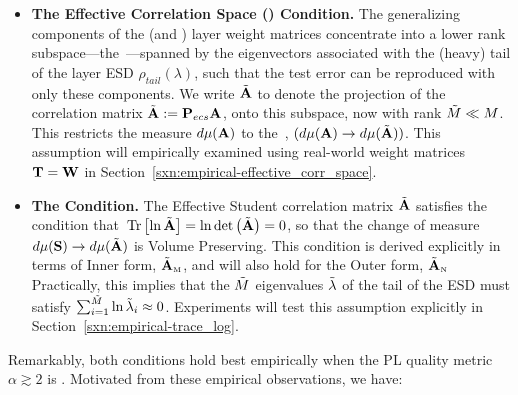 \begin{itemize}
  \item
  \textbf{The Effective Correlation Space (\ECS) Condition.}
  The generalizing components of the \Student (and \Teacher) layer weight matrices concentrate into a lower rank subspace---the~\ECS---spanned by the
  eigenvectors associated with the (heavy) tail of the layer ESD $\rho_{tail}(\lambda)$, such that the test error can 
  be reproduced with only these components. 
  We write $\tilde{\mathbf{A}}$ to denote the projection of the correlation
  matrix $\tilde{\mathbf{A}}:=\mathbf{P}_{ecs}\mathbf{A}$, onto this subspace, now with rank $\tilde{M}\ll M$.
  This restricts the measure $d\mu(\mathbf{A})$ to the~\ECS, $(d\mu(\mathbf{A})\rightarrow d\mu(\tilde{\mathbf{A}}))$.
  This assumption will empirically examined using real-world \Teacher weight matrices ${\mathbf{T}}={\mathbf{W}}$
  in Section~\ref{sxn:empirical-effective_corr_space}. 
  \item
  \textbf{The \TRACELOG Condition.}
  The Effective Student correlation matrix $\tilde{\mathbf{A}}$ 
  satisfies the condition that $\mbox{}\operatorname{Tr}\left[\ln\tilde{\mathbf{A}}\right]=\ln\mbox{}{\text{det}}\left(\tilde{\mathbf{A}}\right)=0$,
  so that the change of measure $d\mu({\mathbf{S}}) \rightarrow d\mu(\tilde{\mathbf{A}}) $ is Volume Preserving.
  This condition is derived explicitly in terms of Inner form,  $\tilde{\mathbf{A}}_{\text{\tiny M}}$, and will also  hold for the Outer form, $\tilde{\mathbf{A}}_{\text{\tiny N}}$
  Practically, this implies that the $\tilde{M}$ eigenvalues $\tilde{\lambda}$
  of the tail of the ESD must satisfy $\sum_{i=1}^{\tilde{M}}\ln\tilde{\lambda}_{i}\approx 0$.
  Experiments will test this assumption explicitly in Section~\ref{sxn:empirical-trace_log}.
\end{itemize}
Remarkably, both conditions hold best empirically when the \HTSR PL quality metric $\alpha\gtrsim 2$ is \Ideal. Motivated from these empirical observations, we have:
